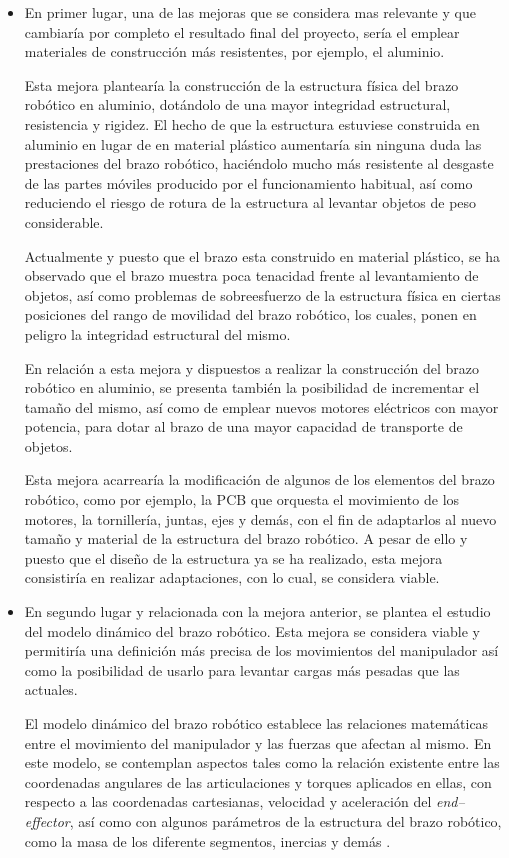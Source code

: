 \begin{itemize}
    \item En primer lugar, una de las mejoras que se considera mas relevante y que cambiaría por completo el resultado final del proyecto, sería el emplear materiales de construcción más resistentes, por ejemplo, el aluminio.
    
    Esta mejora plantearía la construcción de la estructura física del brazo robótico en aluminio, dotándolo de una mayor integridad estructural, resistencia y rigidez. El hecho de que la estructura estuviese construida en aluminio en lugar de en material plástico aumentaría sin ninguna duda las prestaciones del brazo robótico, haciéndolo mucho más resistente al desgaste de las partes móviles producido por el funcionamiento habitual, así como reduciendo el riesgo de rotura de la estructura al levantar objetos de peso considerable.
    
    Actualmente y puesto que el brazo esta construido en material plástico, se ha observado que el brazo muestra poca tenacidad frente al levantamiento de objetos, así como problemas de sobreesfuerzo de la estructura física en ciertas posiciones del rango de movilidad del brazo robótico, los cuales, ponen en peligro la integridad estructural del mismo.
    
    En relación a esta mejora y dispuestos a realizar la construcción del brazo robótico en aluminio, se presenta también la posibilidad de incrementar el tamaño del mismo, así como de emplear nuevos motores eléctricos con mayor potencia, para dotar al brazo de una mayor capacidad de transporte de objetos.
    
    Esta mejora acarrearía la modificación de algunos de los elementos del brazo robótico, como por ejemplo, la PCB que orquesta el movimiento de los motores, la tornillería, juntas, ejes y demás, con el fin de adaptarlos al nuevo tamaño y material de la estructura del brazo robótico. A pesar de ello y puesto que el diseño de la estructura ya se ha realizado, esta mejora consistiría en realizar adaptaciones, con lo cual, se considera viable.
    
    \item En segundo lugar y relacionada con la mejora anterior, se plantea el estudio del modelo dinámico del brazo robótico. Esta mejora se considera viable y permitiría una definición más precisa de los movimientos del manipulador así como la posibilidad de usarlo para levantar cargas más pesadas que las actuales.
    
    El modelo dinámico del brazo robótico establece las relaciones matemáticas entre el movimiento del manipulador y las fuerzas que afectan al mismo. En este modelo, se contemplan aspectos tales como la relación existente entre las coordenadas angulares de las articulaciones y torques aplicados en ellas, con respecto a las coordenadas cartesianas, velocidad y aceleración del \textit{end--effector}, así como con algunos parámetros de la estructura del brazo robótico, como la masa de los diferente segmentos, inercias y demás \cite{universitasmiguelhernandezLibroPracticasRobotica}.
    

\end{itemize}
